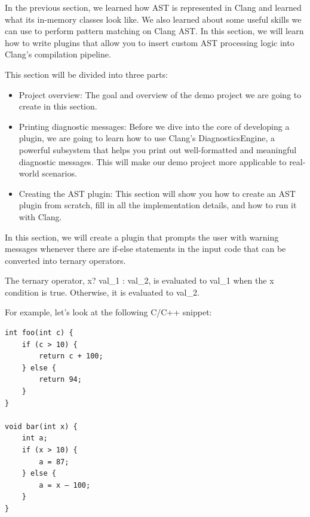 
In the previous section, we learned how AST is represented in Clang and learned what its in-memory classes look like. We also learned about some useful skills we can use to perform pattern matching on Clang AST. In this section, we will learn how to write plugins that allow you to insert custom AST processing logic into Clang's compilation pipeline.

This section will be divided into three parts:

\begin{itemize}
\item Project overview: The goal and overview of the demo project we are going to create in this section.

\item Printing diagnostic messages: Before we dive into the core of developing a plugin, we are going to learn how to use Clang's DiagnosticsEngine, a powerful subsystem that helps you print out well-formatted and meaningful diagnostic messages. This will make our demo project more applicable to real-world scenarios.

\item Creating the AST plugin: This section will show you how to create an AST plugin from scratch, fill in all the implementation details, and how to run it with Clang.
\end{itemize}


In this section, we will create a plugin that prompts the user with warning messages whenever there are if-else statements in the input code that can be converted into ternary operators.

\begin{tcolorbox}[colback=blue!5!white,colframe=blue!75!black, fonttitle=\bfseries,title=Quick Refresher – Ternary Operator]
\hspace*{0.7cm}The ternary operator, x? val\_1 : val\_2, is evaluated to val\_1 when the x condition is true. Otherwise, it is evaluated to val\_2.
\end{tcolorbox}

For example, let's look at the following C/C++ snippet:

\begin{lstlisting}[style=styleCXX]
int foo(int c) {
	if (c > 10) {
		return c + 100;
	} else {
		return 94;
	}
}

void bar(int x) {
	int a;
	if (x > 10) {
		a = 87;
	} else {
		a = x – 100;
	}
}
\end{lstlisting}

